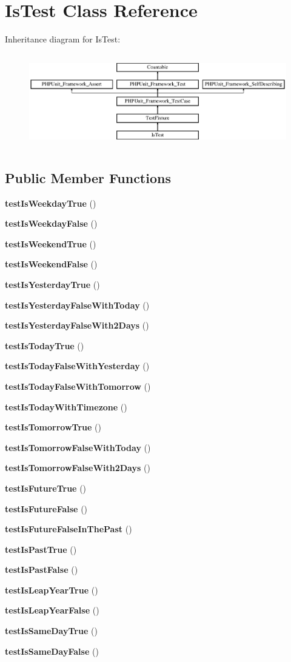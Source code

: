 \section{Is\+Test Class Reference}
\label{class_is_test}
Inheritance diagram for Is\+Test\+:\begin{figure}[H]
\begin{center}
\leavevmode
\includegraphics[height=4.129793cm]{class_is_test}
\end{center}
\end{figure}
\subsection*{Public Member Functions}
\begin{DoxyCompactItemize}
\item 
{\bf test\+Is\+Weekday\+True} ()
\item 
{\bf test\+Is\+Weekday\+False} ()
\item 
{\bf test\+Is\+Weekend\+True} ()
\item 
{\bf test\+Is\+Weekend\+False} ()
\item 
{\bf test\+Is\+Yesterday\+True} ()
\item 
{\bf test\+Is\+Yesterday\+False\+With\+Today} ()
\item 
{\bf test\+Is\+Yesterday\+False\+With2\+Days} ()
\item 
{\bf test\+Is\+Today\+True} ()
\item 
{\bf test\+Is\+Today\+False\+With\+Yesterday} ()
\item 
{\bf test\+Is\+Today\+False\+With\+Tomorrow} ()
\item 
{\bf test\+Is\+Today\+With\+Timezone} ()
\item 
{\bf test\+Is\+Tomorrow\+True} ()
\item 
{\bf test\+Is\+Tomorrow\+False\+With\+Today} ()
\item 
{\bf test\+Is\+Tomorrow\+False\+With2\+Days} ()
\item 
{\bf test\+Is\+Future\+True} ()
\item 
{\bf test\+Is\+Future\+False} ()
\item 
{\bf test\+Is\+Future\+False\+In\+The\+Past} ()
\item 
{\bf test\+Is\+Past\+True} ()
\item 
{\bf test\+Is\+Past\+False} ()
\item 
{\bf test\+Is\+Leap\+Year\+True} ()
\item 
{\bf test\+Is\+Leap\+Year\+False} ()
\item 
{\bf test\+Is\+Same\+Day\+True} ()
\item 
{\bf test\+Is\+Same\+Day\+False} ()
\end{DoxyCompactItemize}
